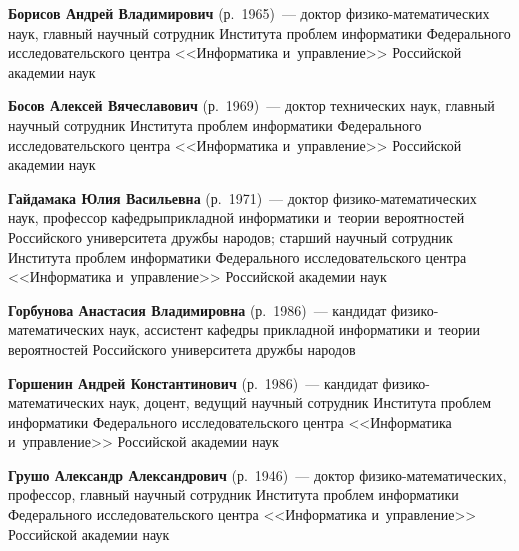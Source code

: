 \begin{multicols}{2}

\noindent
\textbf{Борисов Андрей Владимирович} (р.\ 1965)~--- 
доктор фи\-зи\-ко-ма\-те\-ма\-ти\-че\-ских наук, главный научный сотрудник 
Института проб\-лем информатики Федерального исследовательского центра 
<<Информатика и~управ\-ле\-ние>> Российской академии наук

\vspace*{3pt}

\noindent
\textbf{Босов Алексей Вячеславович} (р.\ 1969)~--- 
доктор технических наук, главный научный со\-труд\-ник Института проб\-лем 
информатики Федерального исследовательского центра <<Информатика и~управ\-ле\-ние>> 
Российской академии наук

\vspace*{3pt}

\noindent
\textbf{Гайдамака Юлия Васильевна} (р.\ 1971)~--- доктор 
фи\-зи\-ко-ма\-те\-ма\-ти\-че\-ских наук, профессор кафед\-ры\linebreak прикладной информатики 
и~тео\-рии вероятностей Российского университета друж\-бы народов; 
старший научный со\-труд\-ник Института проб\-лем информатики Федерального 
исследовательского цент\-ра <<Информатика и~управ\-ле\-ние>> 
Российской академии наук

\vspace*{3pt}

\noindent
\textbf{Горбунова Анастасия Владимировна} (р.\ 1986)~--- кандидат 
фи\-зи\-ко-ма\-те\-ма\-ти\-че\-ских наук, ассистент кафедры 
прикладной информатики и~тео\-рии вероятностей Российского университета друж\-бы 
народов

\vspace*{3pt}


\noindent
\textbf{Горшенин Андрей Константинович} (р.\ 1986)~--- 
кандидат фи\-зи\-ко-ма\-те\-ма\-ти\-че\-ских наук, доцент, ведущий научный 
сотрудник Института проб\-лем информатики Федерального исследовательского 
цент\-ра <<Информатика и~управ\-ле\-ние>> Российской академии наук

\vspace*{3pt}

\noindent
\textbf{Грушо Александр Александрович} (р.\ 1946)~--- доктор 
фи\-зи\-ко-ма\-те\-ма\-ти\-че\-ских, профессор, главный научный со\-труд\-ник 
Института проб\-лем информатики Федерального исследовательского цент\-ра 
<<Информатика и~управ\-ле\-ние>> Российской академии наук

\vspace*{3pt}


\end{multicols}
